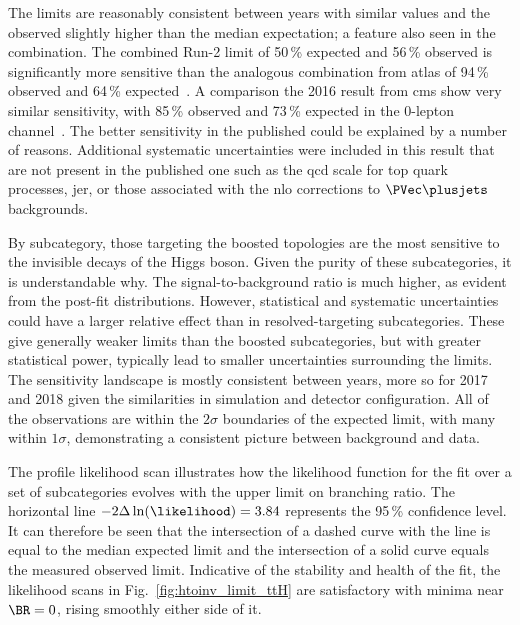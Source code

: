 The limits are reasonably consistent between years with similar values and the observed slightly higher than the median expectation; a feature also seen in the combination. The combined Run-2 limit of 50\,\% expected and 56\,\% observed is significantly more sensitive than the analogous combination from \acrshort{atlas} of 94\,\% observed and 64\,\% expected~\cite{ATLAS:2020kdi}. A comparison the 2016 result from \acrshort{cms} show very similar sensitivity, with 85\,\% observed and 73\,\% expected in the 0-lepton channel~\cite{CMS-PAS-HIG-18-008}. The better sensitivity in the published could be explained by a number of reasons. Additional systematic uncertainties were included in this result that are not present in the published one such as the \acrshort{qcd} scale for top quark processes, \acrlong{jer}, or those associated with the \acrshort{nlo} corrections to $\PVec \plusjets$ backgrounds.

By subcategory, those targeting the boosted topologies are the most sensitive to the invisible decays of the Higgs boson. Given the purity of these subcategories, it is understandable why. The signal-to-background ratio is much higher, as evident from the post-fit distributions. However, statistical and systematic uncertainties could have a larger relative effect than in resolved-targeting subcategories. These give generally weaker limits than the boosted subcategories, but with greater statistical power, typically lead to smaller uncertainties surrounding the limits. The sensitivity landscape is mostly consistent between years, more so for 2017 and 2018 given the similarities in simulation and detector configuration. All of the observations are within the $\text{2}\sigma$ boundaries of the expected limit, with many within $\text{1}\sigma$, demonstrating a consistent picture between background and data.

The profile likelihood scan illustrates how the likelihood function for the fit over a set of subcategories evolves with the upper limit on branching ratio. The horizontal line $-\text{2}\Delta \ln(\likelihood) = \text{3.84}$ represents the 95\,\% confidence level. It can therefore be seen that the intersection of a dashed curve with the line is equal to the median expected limit and the intersection of a solid curve equals the measured observed limit. Indicative of the stability and health of the fit, the likelihood scans in Fig.~\ref{fig:htoinv_limit_ttH} are satisfactory with minima near $\BR = \text{0}$, rising smoothly either side of it.

\clearpage


